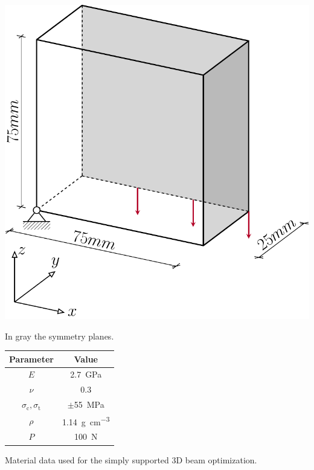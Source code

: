 \begin{marginfigure}
    \centering
    \includegraphics[width=\linewidth]{figures/05_cellular_opt/00_supported_bc/supported_3D_symm.pdf}
    \caption{In gray the symmetry planes.}
    \label{fig:05_symm_support_bc}
\end{marginfigure}
\begin{margintable}
    \small
    \centering
    \begin{tabular}{cc}
    \toprule
    \textbf{Parameter}        & \textbf{Value} \\ \midrule
    $E$              & \qty{2.7}{GPa}     \\
    $\nu$            & 0.3   \\
    $\sigma_\text{c}, \sigma_\text{t}$ & $\pm $\qty{55}{MPa} \\
    $\rho$              & \qty{1.14}{\gram\per\cubic\centi\metre}   \\
    $P$              & \qty{100}{N}   \\
    \bottomrule
    \end{tabular}
    \caption{Material data used for the simply supported 3D beam optimization.}
    \label{tab:05_3D_supp_mat}
\end{margintable}
